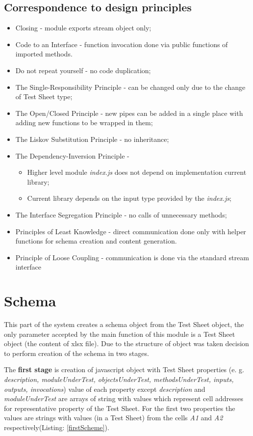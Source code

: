 \subsection{Correspondence to design principles}
\begin{itemize}
	\item Closing - module exports stream object only;
	\item Code to an Interface - function invocation done via public functions of imported methods. 
	\item Do not repeat yourself - no code duplication;
	\item The Single-Responsibility Principle - can be changed only due to the change of Test Sheet type;
	\item The Open/Closed Principle - new pipes can be added in a single place with adding new functions to be wrapped in them;
	\item The Liskov Substitution Principle - no inheritance;
	\item The Dependency-Inversion Principle - 
				\begin{itemize}
					\item Higher level module \textit{index.js} does not depend on implementation current library;
					\item Current library depends on the input type provided by the \textit{index.js};
				\end{itemize}
	\item The Interface Segregation Principle -  no calls of unnecessary methods;
	\item Principles of Least Knowledge - direct communication done only with helper functions for schema creation and content generation. 
	\item Principle of Loose Coupling - communication is done via the standard stream interface
\end{itemize}


\section{Schema}
This part of the system creates a schema object from the Test Sheet object, the only parameter accepted by the main function of this module is a Test Sheet object (the content of xlsx file). Due to the structure of object was taken decision to perform creation of the schema in two stages.

The \textbf{first stage} is creation of javascript object with Test Sheet properties (e. g. \textit{description, moduleUnderTest, objectsUnderTest, methodsUnderTest, inputs, outputs, invocations}) value of each property except \textit{description} and \textit{moduleUnderTest} are arrays of string with values which represent cell addresses for representative property of the Test Sheet. For the first two properties the values are strings with values (in a Test Sheet) from the cells \textit{A1} and \textit{A2} respectively(Listing: \ref{firstScheme}).


